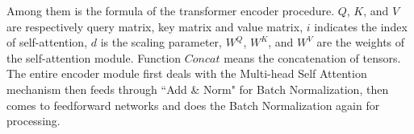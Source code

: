 \documentclass[11pt,a4paper]{article}
\begin{document}
Among them is the formula of the transformer encoder procedure. $Q$, $K$, and $V$ are respectively query matrix, key matrix and value matrix, $i$ indicates the index of self-attention, $d$ is the scaling parameter, $W^Q$, $W^K$, and $W^V$ are the weights of the self-attention module. Function $Concat$ means the concatenation of tensors. The entire encoder module first deals with the Multi-head Self Attention mechanism then feeds through ``Add \& Norm" for Batch Normalization, then comes to feedforward networks and does the Batch Normalization again for processing.
\makeatletter\def\@captype{table}\makeatother
\begin{table}[!htbp] 
\centering
\begin{tabular}{lllllllllll|llllllllllll|llllllllllll|llllllllllll}


\end{tabular}
\end{table}
\end{document}
